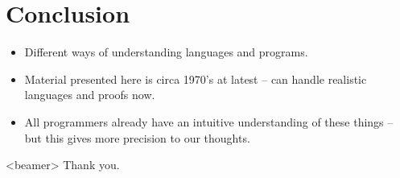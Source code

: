 \section{Conclusion}

\begin{frame}
    \begin{itemize}[<+->]
        \item Different ways of understanding languages and programs.
        \item Material presented here is circa 1970's at latest\cite{winskel1993formal}
            -- can handle realistic languages and proofs now.
        \item All programmers already have an intuitive understanding of these
            things -- but this gives more precision to our thoughts.
    \end{itemize}
\end{frame}

\begin{frame}<beamer>
  Thank you.
\end{frame}

\appendix%

\begin{frame}[allowframebreaks]
  
  
\end{frame}



